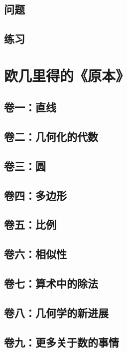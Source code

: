 \documentclass[cn,fancy,blue,11pt]{elegantbook}
\begin{document}
\section{问题}

\section{练习}

\chapter{欧几里得的《原本》}

\section{卷一：直线}

\section{卷二：几何化的代数}

\section{卷三：圆}

\section{卷四：多边形}

\section{卷五：比例}

\section{卷六：相似性}

\section{卷七：算术中的除法}

\section{卷八：几何学的新进展}

\section{卷九：更多关于数的事情}
\end{document}
